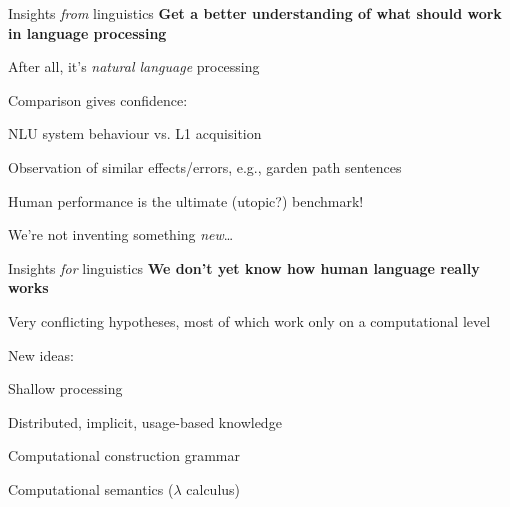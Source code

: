 \documentclass[aspectratio=169,cramped]{beamer}
\let\tempone\itemize
\let\temptwo\enditemize
\renewenvironment{itemize}{\tempone\addtolength{\itemsep}{-0\baselineskip}\addtolength{\parskip}{-0.2\baselineskip}}{\temptwo}
\begin{document}
\begin{frame}{Insights \textit{from} linguistics}
	\textbf{Get a better understanding of what should work in language processing}
	\begin{itemize}
  \item After all, it's \emph{natural language} processing
  \item Comparison gives confidence:
    \begin{itemize}
    \item NLU system behaviour vs. L1 acquisition
    \item Observation of similar effects/errors, e.g., garden path sentences
    \item Human performance is the ultimate (utopic?) benchmark!
    \item We're not inventing something \emph{new}\ldots
    \end{itemize}
  \end{itemize}
\end{frame}

\begin{frame}{Insights \textit{for} linguistics}
	\textbf{We don't yet know how human language really works}
	\begin{itemize}
  \item Very conflicting hypotheses, most of which work only on a computational level
  \item New ideas:
    \begin{itemize}
    \item Shallow processing
    \item Distributed, implicit, usage-based knowledge
    \item Computational construction grammar
    \item Computational semantics (\(\lambda\) calculus)
    \end{itemize}
  \end{itemize}
\end{frame}
\end{document}

